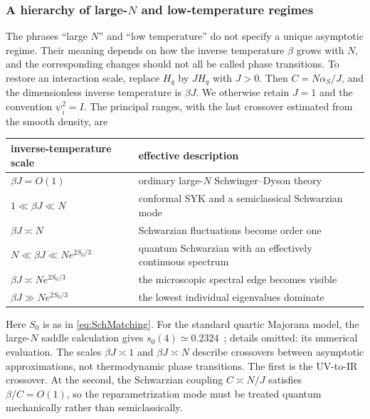 \documentclass[11pt]{article}
\numberwithin{equation}{section}
\theoremstyle{exposition}
\theoremstyle{result}
\begin{document}
\subsubsection{A hierarchy of large-$N$ and low-temperature regimes}

The phrases ``large $N$'' and ``low temperature'' do not specify a unique asymptotic regime.  Their meaning depends on how the inverse temperature $\beta$ grows with $N$, and the corresponding changes should not all be called phase transitions.  To restore an interaction scale, replace $H_q$ by $JH_q$ with $J>0$. Then $C=N\alpha_S/J$, and the dimensionless inverse temperature is $\beta J$. We otherwise retain $J=1$ and the convention $\psi_i^2=I$.  The principal ranges, with the last crossover estimated from the smooth density, are
\begin{center}
\begin{tabular}{@{}ll@{}}
\toprule
inverse-temperature scale & effective description \\
\midrule
$\beta J=O(1)$ & ordinary large-$N$ Schwinger--Dyson theory \\
$1\ll\beta J\ll N$ & conformal SYK and a semiclassical Schwarzian mode \\
$\beta J\asymp N$ & Schwarzian fluctuations become order one \\
$N\ll\beta J\ll N e^{2S_0/3}$
    & quantum Schwarzian with an effectively continuous spectrum \\
$\beta J\asymp N e^{2S_0/3}$
    & the microscopic spectral edge becomes visible \\
$\beta J\gg N e^{2S_0/3}$
    & the lowest individual eigenvalues dominate \\
\bottomrule
\end{tabular}
\end{center}
Here $S_0$ is as in \eqref{eq:SchMatching}.  For the standard quartic Majorana model, the large-$N$ saddle calculation gives $s_0(4)\simeq0.2324$~\cite{MaldacenaStanford}; details omitted: its numerical evaluation.  The scales $\beta J\asymp1$ and $\beta J\asymp N$ describe crossovers between asymptotic approximations, not thermodynamic phase transitions.  The first is the UV-to-IR crossover.  At the second, the Schwarzian coupling $C\asymp N/J$ satisfies $\beta/C=O(1)$, so the reparametrization mode must be treated quantum mechanically rather than semiclassically.
\end{document}
